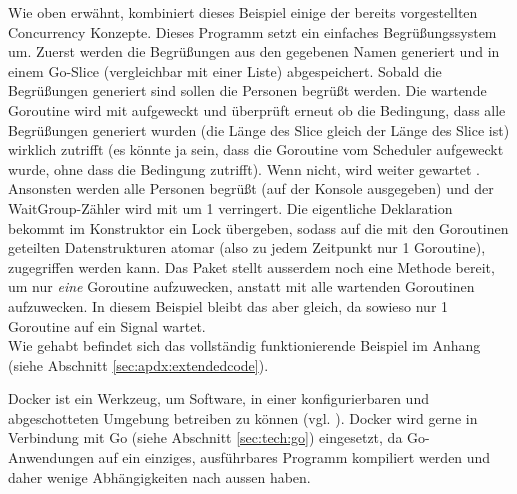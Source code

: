 Wie oben erwähnt, kombiniert dieses Beispiel einige der bereits vorgestellten Concurrency Konzepte. Dieses Programm setzt ein einfaches Begrüßungssystem um. Zuerst  werden die Begrüßungen aus den gegebenen Namen  generiert und in einem Go-Slice (vergleichbar mit einer Liste)  abgespeichert. Sobald die Begrüßungen generiert sind sollen die Personen begrüßt werden. Die wartende Goroutine wird mit   aufgeweckt und überprüft erneut ob die Bedingung, dass alle Begrüßungen generiert wurden (die Länge des  Slice gleich der Länge des  Slice ist) wirklich zutrifft  (es könnte ja sein, dass die Goroutine vom Scheduler aufgeweckt wurde, ohne dass die Bedingung zutrifft). Wenn nicht, wird weiter gewartet . Ansonsten werden alle Personen begrüßt  (auf der Konsole ausgegeben)  und der WaitGroup-Zähler wird mit   um 1 verringert. Die eigentliche  Deklaration bekommt im Konstruktor ein  Lock übergeben, sodass auf die mit den Goroutinen geteilten Datenstrukturen atomar (also zu jedem Zeitpunkt nur 1 Goroutine), zugegriffen werden kann. Das  Paket stellt ausserdem noch eine  Methode bereit, um nur \textit{eine} Goroutine aufzuwecken, anstatt mit  alle wartenden Goroutinen aufzuwecken. In diesem Beispiel bleibt das aber gleich, da sowieso nur 1 Goroutine auf ein Signal wartet.\\
Wie gehabt befindet sich das vollständig funktionierende Beispiel im Anhang (siehe Abschnitt \ref{sec:apdx:extendedcode}).



\newpage
Docker ist ein Werkzeug, um Software, in einer konfigurierbaren und abgeschotteten Umgebung betreiben zu können (vgl. \cite{wiki:docker}). Docker wird gerne in Verbindung mit Go (siehe Abschnitt \ref{sec:tech:go}) eingesetzt, da Go-Anwendungen auf ein einziges, ausführbares Programm kompiliert werden und daher wenige Abhängigkeiten nach aussen haben.  
